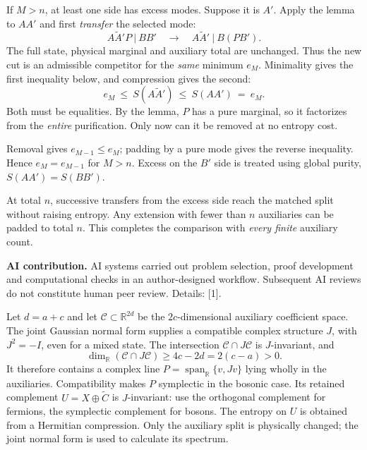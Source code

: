 \documentclass[11pt,a4paper]{article}
\newcommand{\R}{\mathbb R}
\newcommand{\heading}[1]{\par\vspace{5pt}{\large\bfseries #1}\par\vspace{1pt}}
\begin{document}
If $M>n$, at least one side has excess modes. Suppose it is $A'$. Apply the lemma to $AA'$ and first \emph{transfer} the selected mode:
\begin{equation*}
A\widetilde A'P\ \big|\ BB'
\quad\longrightarrow\quad
A\widetilde A'\ \big|\ B(PB').
\end{equation*}
The full state, physical marginal and auxiliary total are unchanged. Thus the new cut is an admissible competitor for the \emph{same} minimum $e_M$. Minimality gives the first inequality below, and compression gives the second:
\begin{equation*}
e_M\ \le\ S(A\widetilde A')\ \le\ S(AA')\ =\ e_M.
\end{equation*}
Both must be equalities. By the lemma, $P$ has a pure marginal, so it factorizes from the \emph{entire} purification. Only now can it be removed at no entropy cost.

Removal gives $e_{M-1}\le e_M$; padding by a pure mode gives the reverse inequality. Hence $e_M=e_{M-1}$ for $M>n$. Excess on the $B'$ side is treated using global purity, $S(AA')=S(BB')$.

At total $n$, successive transfers from the excess side reach the matched split without raising entropy. Any extension with fewer than $n$ auxiliaries can be padded to total $n$. This completes the comparison with \emph{every finite} auxiliary count.

{\small\textbf{AI contribution.} AI systems carried out problem selection, proof development and computational checks in an author-designed workflow. Subsequent AI reviews do not constitute human peer review. Details: [1].}

\newpage
\heading{Inside the compression lemma}
Let $d=a+c$ and let $\mathcal C\subset\R^{2d}$ be the $2c$-dimensional auxiliary coefficient space. The joint Gaussian normal form supplies a compatible complex structure $J$, with $J^2=-I$, even for a mixed state. The intersection $\mathcal C\cap J\mathcal C$ is $J$-invariant, and
\begin{equation*}
\dim_{\R}(\mathcal C\cap J\mathcal C)\ge 4c-2d=2(c-a)>0.
\end{equation*}
It therefore contains a complex line $P=\operatorname{span}_{\R}\{v,Jv\}$ lying wholly in the auxiliaries. Compatibility makes $P$ symplectic in the bosonic case. Its retained complement $U=X\oplus\widetilde C$ is $J$-invariant: use the orthogonal complement for fermions, the symplectic complement for bosons. The entropy on $U$ is obtained from a Hermitian compression. Only the auxiliary split is physically changed; the joint normal form is used to calculate its spectrum.
\end{document}
